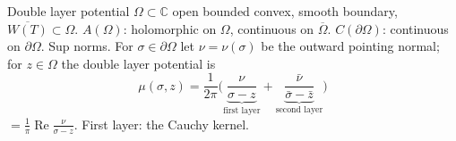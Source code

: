 \documentclass[14pt]{beamer}
\newcommand{\C}{\mathbb{C}}
\DeclareMathOperator{\re}{Re}
\begin{document}
\begin{frame}{Double layer potential}
  $\Omega\subset\C$ open bounded convex, smooth boundary, $\overline{W(T)}\subset\Omega$. $A(\Omega)$: holomorphic on $\Omega$, continuous on $\overline\Omega$. $C(\partial\Omega)$: continuous on $\partial\Omega$. Sup norms.
  For $\sigma\in\partial\Omega$ let $\nu=\nu(\sigma)$ be the outward pointing normal; for $z\in\Omega$ the double layer potential is
  \[
    \mu(\sigma,z)=\frac{1}{2\pi}\Big(\underbrace{\frac{\nu}{\sigma-z}}_{\text{first layer}}+\underbrace{\frac{\bar\nu}{\bar\sigma-\bar z}}_{\text{second layer}}\Big)
  \]
  $=\frac1\pi\re\frac{\nu}{\sigma-z}$. First layer: the Cauchy kernel.
\end{frame}
\end{document}
